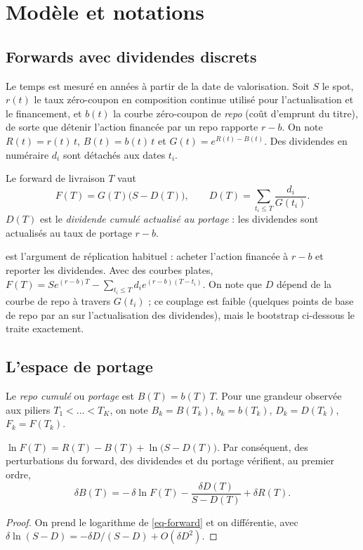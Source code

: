 \section{Modèle et notations}\label{sec-model}

\subsection{Forwards avec dividendes discrets}
Le temps est mesuré en années à partir de la date de valorisation. Soit $S$ le spot, $r(t)$ le taux zéro-coupon en
composition continue utilisé pour l'actualisation et le financement, et $b(t)$ la courbe zéro-coupon de \emph{repo}
(coût d'emprunt du titre), de sorte que détenir l'action financée par un repo rapporte $r-b$. On note $R(t)=r(t)\,t$,
$B(t)=b(t)\,t$ et $G(t)=e^{R(t)-B(t)}$. Des dividendes en numéraire $d_i$ sont détachés aux dates $t_i$.

\begin{definition}[Forward]\label{def-forward}
Le forward de livraison $T$ vaut
\begin{equation}\label{eq-forward}
F(T)=G(T)\bigl(S-D(T)\bigr),\qquad D(T)=\sum_{t_i\le T}\frac{d_i}{G(t_i)}.
\end{equation}
$D(T)$ est le \emph{dividende cumulé actualisé au portage} : les dividendes sont actualisés au taux de portage $r-b$.
\end{definition}

 est l'argument de réplication habituel : acheter l'action financée à $r-b$ et reporter les
dividendes. Avec des courbes plates, $F(T)=Se^{(r-b)T}-\sum_{t_i\le T}d_ie^{(r-b)(T-t_i)}$. On note que $D$ dépend de la
courbe de repo à travers $G(t_i)$ ; ce couplage est faible (quelques points de base de repo par an sur l'actualisation
des dividendes), mais le bootstrap ci-dessous le traite exactement.

\subsection{L'espace de portage}
\begin{definition}[Portage]\label{def-carry}
Le \emph{repo cumulé} ou \emph{portage} est $B(T)=b(T)\,T$. Pour une grandeur observée aux piliers $T_1<\dots<T_K$, on
note $B_k=B(T_k)$, $b_k=b(T_k)$, $D_k=D(T_k)$, $F_k=F(T_k)$.
\end{definition}

\begin{lemma}\label{lem-additivity}
$\ln F(T)=R(T)-B(T)+\ln\bigl(S-D(T)\bigr)$. Par conséquent, des perturbations du forward, des dividendes et du portage
vérifient, au premier ordre,
\begin{equation}\label{eq-additivity}
\delta B(T)=-\,\delta\ln F(T)-\frac{\delta D(T)}{S-D(T)}+\delta R(T).
\end{equation}
\end{lemma}
\begin{proof}
On prend le logarithme de \cref{eq-forward} et on différentie, avec $\delta\ln(S-D)=-\delta D/(S-D)+O(\delta D^2)$.
\end{proof}

